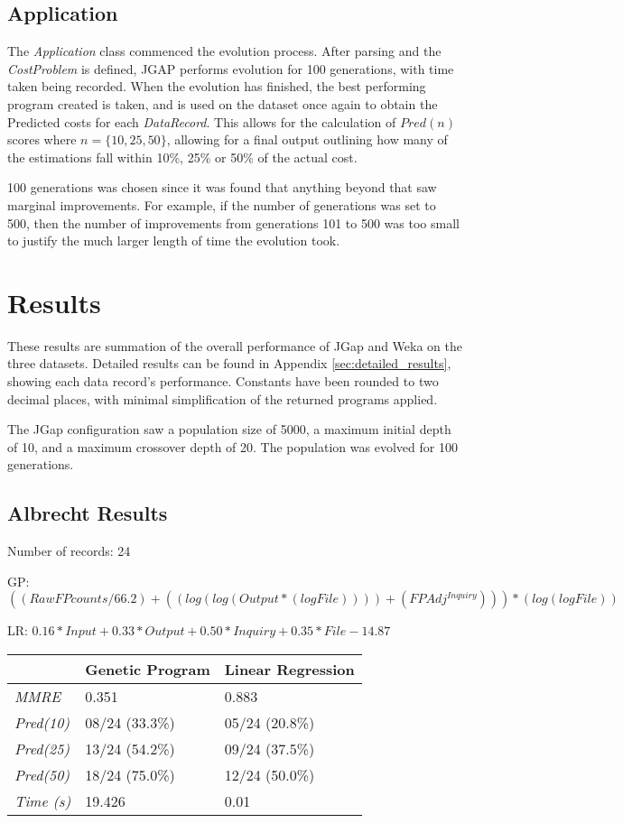 \documentclass[11pt, a4paper]{article}
\begin{document}
\subsection{Application} %
\label{sub:application}
The \emph{Application} class commenced the evolution process. After parsing and
the \emph{CostProblem} is defined, JGAP performs evolution for 100 generations,
with time taken being recorded. When the evolution has finished, the best
performing program created is taken, and is used on the dataset once again to
obtain the Predicted costs for each \emph{DataRecord}. This allows for the
calculation of \(Pred(n)\) scores where \(n = \{10, 25, 50\}\), allowing for a
final output outlining how many of the estimations fall within 10\%, 25\% or
50\% of the actual cost.

100 generations was chosen since it was found that anything beyond that saw
marginal improvements. For example, if the number of generations was set to 500,
then the number of improvements from generations 101 to 500 was too small to
justify the much larger length of time the evolution took.
\newpage
\section{Results} %
\label{sec:results}
These results are summation of the overall performance of JGap and Weka on the
three datasets. Detailed results can be found in Appendix
\ref{sec:detailed_results}, showing each data record's performance.
Constants have been rounded to two decimal places, with minimal simplification
of the returned programs applied.

The JGap configuration saw a population size of 5000, a maximum initial depth of
10, and a maximum crossover depth of 20. The population was evolved for 100
generations.

\subsection{Albrecht Results} %
\label{sub:albrecht_results}
Number of records: 24

GP:
\(((RawFPcounts / 66.2) + ((log (log (Output * (log File)))) +
(FPAdj ^ {Inquiry}))) * (log (log File))\)

LR:
\(0.16 * Input + 0.33 * Output + 0.50 * Inquiry + 0.35 * File - 14.87\)

\begin{tabularx}{\textwidth}{| l | X | X |}
\hline
 & \textbf{Genetic Program} & \textbf{Linear Regression} \\
\hline
\emph{MMRE} & 0.351 & 0.883 \\
\hline
\emph{Pred(10)} & 08/24 (33.3\%) & 05/24 (20.8\%) \\
\emph{Pred(25)} & 13/24 (54.2\%) & 09/24 (37.5\%) \\
\emph{Pred(50)} & 18/24 (75.0\%) & 12/24 (50.0\%) \\
\hline
\emph{Time (s)} & 19.426 & 0.01 \\
\hline
\end{tabularx}
\end{document}
